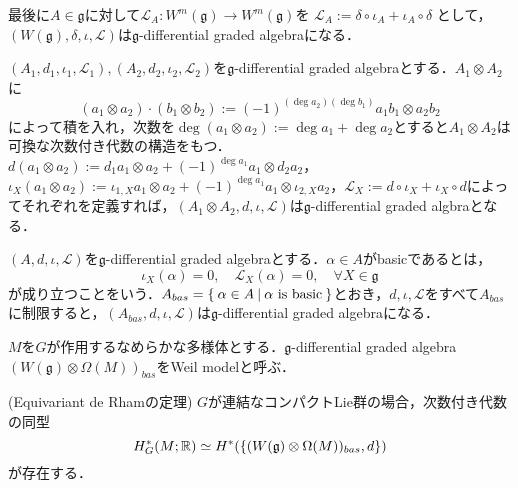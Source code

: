 \begin{eg}
最後に$A\in\mathfrak{g}$に対して$\mathcal{L}_A\colon W^m(\mathfrak{g})\rightarrow W^m(\mathfrak{g})$を
$
\mathcal{L}_A:=\delta\circ\iota_A + \iota_A\circ\delta
$
として，$(W(\mathfrak{g}),\delta,\iota,\mathcal{L})$は$\mathfrak{g}$-differential graded algebraになる．
\end{eg}

\begin{eg}\label{tonsor of g-dga}
  $(A_1,d_1,\iota_1,\mathcal{L}_1),(A_2,d_2,\iota_2,\mathcal{L}_2)$を$\mathfrak{g}$-differential graded algebraとする．$A_1\otimes A_2$に
  \[
  (a_1\otimes a_2)\cdot (b_1\otimes b_2):=(-1)^{(\deg a_2)(\deg b_1)}a_1b_1\otimes a_2b_2
  \]
  によって積を入れ，次数を$\deg(a_1\otimes a_2) := \deg a_1 + \deg a_2$とすると$A_1\otimes A_2$は可換な次数付き代数の構造をもつ．
  $d(a_1\otimes a_2) := d_1a_1\otimes a_2 + (-1)^{\deg a_1}a_1\otimes d_2a_2$，$\iota_X(a_1\otimes a_2) := \iota_{1,X}a_1\otimes a_2 + (-1)^{\deg a_1}a_1\otimes\iota_{2,X}a_2$，$\mathcal{L}_X := d\circ \iota_X + \iota_X \circ d$によってそれぞれを定義すれば，$(A_1\otimes A_2,d,\iota,\mathcal{L})$は$\mathfrak{g}$-differential graded algbraとなる．
\end{eg}

\begin{defin}
  $(A,d,\iota,\mathcal{L})$を$\mathfrak{g}$-differential graded algebraとする．$\alpha\in A$がbasicであるとは，
  \[
  \iota_X(\alpha) = 0,\quad\mathcal{L}_X(\alpha) = 0,\quad \forall X\in\mathfrak{g}
  \]
  が成り立つことをいう．$A_{bas}=\left\{\:\alpha\in A\:\middle|\:\alpha\text{ is basic}\:\right\}$とおき，$d,\iota,\mathcal{L}$をすべて$A_{bas}$に制限すると，$(A_{bas},d,\iota,\mathcal{L})$は$\mathfrak{g}$-differential graded algebraになる．
\end{defin}

\begin{defin}
  $M$を$G$が作用するなめらかな多様体とする．$\mathfrak{g}$-differential graded algebra $(W(\mathfrak{g})\otimes\Omega(M))_{bas}$をWeil modelと呼ぶ．
\end{defin}

\begin{theo}(Equivariant de Rhamの定理\cite{cartan2})
  $G$が連結なコンパクトLie群の場合，次数付き代数の同型
  \[
  H^*_G(M;\mathbb{R})\simeq H^*(\{(W(\mathfrak{g})\otimes\Omega(M))_{bas},d\})
  \]
  が存在する．
\end{theo}

